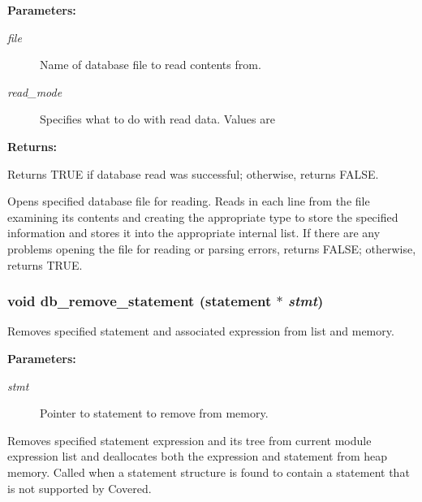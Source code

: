 \begin{Desc}
\item[{\bf Parameters: }]\par
\begin{description}
\item[
{\em file}]Name of database file to read contents from. \item[
{\em read\_\-mode}]Specifies what to do with read data. Values are
\end{description}
\end{Desc}
\begin{Desc}
\item[{\bf Returns: }]\par
Returns TRUE if database read was successful; otherwise, returns FALSE.

\end{Desc}
Opens specified database file for reading. Reads in each line from the file examining its contents and creating the appropriate type to store the specified information and stores it into the appropriate internal list. If there are any problems opening the file for reading or parsing errors, returns FALSE; otherwise, returns TRUE. 
\subsubsection{\setlength{\rightskip}{0pt plus 5cm}void db\_\-remove\_\-statement ({\bf statement} $\ast$ {\em stmt})}\label{db_8h_a15}


Removes specified statement and associated expression from list and memory.

\begin{Desc}
\item[{\bf Parameters: }]\par
\begin{description}
\item[
{\em stmt}]Pointer to statement to remove from memory.

\end{description}
\end{Desc}
Removes specified statement expression and its tree from current module expression list and deallocates both the expression and statement from heap memory. Called when a statement structure is found to contain a statement that is not supported by Covered. 
